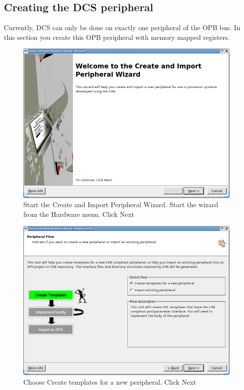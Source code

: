 \documentclass[a4paper,oneside]{memoir}
\begin{document}
\subsection{Creating the DCS peripheral}\label{sec:creating_peripheral}
Currently, DCS can only be done on exactly one peripheral of the OPB bus. In this section you create this OPB peripheral with memory mapped registers.
\begin{figure}[H]
\centering
\includegraphics[scale=0.5]{COIP1}
\caption{Start the Create and Import Peripheral Wizard. Start the wizard from the Hardware menu. Click Next\label{fig:COIP1}}
\end{figure}
\begin{figure}[H]
\centering
\includegraphics[scale=0.5]{COIP2}
\caption{Choose Create templates for a new peripheral. Click Next\label{fig:COIP2}}
\end{figure}
\end{document}
